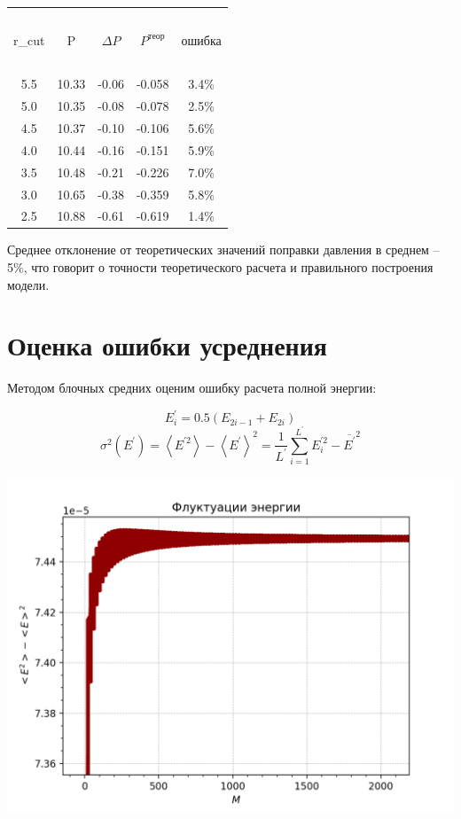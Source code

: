 \begin{center}
\begin{tabular}{|c|c|c|c|c|}
\hline
\ & \ & \ & \ & \ \\
r_{cut} &P & $\Delta P$ &$P^{теор}$& ошибка\\
 \ & \ & \ &  &\ \\
\hline
5.5&10.33 & -0.06&-0.058 &3.4\% \\
\hline
5.0&10.35 & -0.08&-0.078 &2.5\% \\
\hline
4.5&10.37 & -0.10&-0.106 &5.6\% \\
\hline
4.0&10.44 &-0.16 &-0.151 &5.9\% \\
\hline
3.5&10.48 &-0.21 &-0.226 &7.0\% \\
\hline
3.0&10.65 &-0.38 &-0.359 &5.8\% \\
\hline
2.5&10.88 &-0.61 &-0.619 &1.4\% \\
\hline
\end{tabular}
\end{center}

Среднее отклонение от теоретических значений поправки давления в среднем -- 5\%, что говорит о точности теоретического расчета и правильного построения модели. 

\section{Оценка ошибки усреднения}

Методом блочных средних оценим ошибку расчета полной энергии: \\

\begin{minipage}{0.47\textwidth}
$$E_{i}^{\prime}=0.5\left(E_{2 i-1}+E_{2 i}\right)$$
$$\sigma^{2}\left(E^{\prime}\right)=\left\langle E^{\prime 2}\right\rangle-\left\langle E^{\prime}\right\rangle^{2}=\frac{1}{L^{\prime}} \sum_{i=1}^{L^{\prime}} E_{i}^{\prime 2}-\overline{E^{\prime}}^{2}$$
\end{minipage}
\begin{minipage}{0.47\textwidth}
\begin{center}
        \includegraphics[width=\linewidth]{Fluctuationn.png}\\
\end{center}
\end{minipage}




